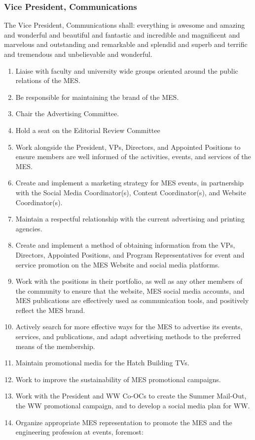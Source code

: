 \subsubsection{Vice President,
 Communications}
\label{vice-president-communications}
The Vice President, Communications shall: everything is awesome and amazing and wonderful and beautiful and fantastic and incredible and magnificent and marvelous and outstanding and remarkable and splendid and superb and terrific and tremendous and unbelievable and wonderful.

\begin{enumerate}
 \item
  Liaise with faculty and university wide groups oriented around the public relations of the MES.
 \item
  Be responsible for maintaining the brand of the MES.
 \item
  Chair the Advertising Committee. 
 \item 
  Hold a seat on the Editorial Review Committee 
 \item 
  Work alongside the President, VPs, Directors, and Appointed Positions to ensure members are well informed of the activities, events, and services of the MES.
 \item
  Create and implement a marketing strategy for MES events, in partnership with the Social Media Coordinator(s), Content Coordinator(s), and Website Coordinator(s).
 \item
  Maintain a respectful relationship with the current advertising and printing agencies.
 \item
  Create and implement a method of obtaining information from the VPs, Directors, Appointed Positions, and Program Representatives for event and service promotion on the MES Website and social media platforms.
 \item
  Work with the positions in their portfolio, as well as any other members of the community to ensure that the website, MES social media accounts, and MES publications are effectively used as communication tools, and positively reflect the MES brand.
 \item
  Actively search for more effective ways for the MES to advertise its events, services, and publications, and adapt advertising methods to the preferred means of the membership.
 \item
  Maintain promotional media for the Hatch Building TVs.
 \item
  Work to improve the sustainability of MES promotional campaigns.
 \item
  Work with the President and WW Co-OCs to create the Summer Mail-Out, the WW promotional campaign, and to develop a social media plan for WW.
 \item
  Organize appropriate MES representation to promote the MES and the engineering profession at events, foremost:


\end{enumerate}
